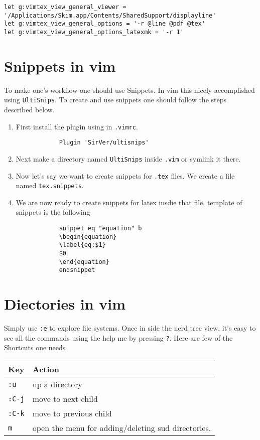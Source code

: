 \documentclass{article}
\begin{document}
\begin{verbatim}
let g:vimtex_view_general_viewer = '/Applications/Skim.app/Contents/SharedSupport/displayline'
let g:vimtex_view_general_options = '-r @line @pdf @tex'
let g:vimtex_view_general_options_latexmk = '-r 1'   
\end{verbatim}


\section{Snippets in vim}
\label{sec:snippets-in-vim}
To make one's workflow one should use Snippets. In vim this nicely accomplished
using \verb!UltiSnips!. To create and use snippets one should follow the steps
described below.

\begin{enumerate}
    \item First install the plugin using in \verb!.vimrc!. 
        \begin{verbatim}
            Plugin 'SirVer/ultisnips'
        \end{verbatim}
    \item Next make a directory named \verb!UltiSnips! inside \verb!.vim! or
        symlink it there. 
    \item Now let's say we want to create snippets for \verb!.tex! files. We
        create a file named \verb!tex.snippets!. 
    \item We are now ready to create snippets for latex insdie that file.
        template of snippets is the following
        \begin{verbatim}
            snippet eq "equation" b
            \begin{equation}
	        \label{eq:$1}
	        $0
            \end{equation}
            endsnippet
        \end{verbatim}
\end{enumerate}

\section{Diectories in vim}%
\label{sec:diectories_in_vim}
Simply use \verb!:e! to explore file systems. Once in side the nerd tree view,
it's easy to see all the commands using the help me by pressing \verb!?!. Here
are few of the Shortcuts one needs

\begin{tabular}{ll}
    \toprule
    Key & Action \\ \midrule
    \verb!:u! & up a directory\\ \midrule
    \verb!:C-j! & move to next child \\ \midrule
    \verb!:C-k! & move to previous child\\ \midrule
    \verb!m! & open the menu for adding/deleting sud directories.\\ \bottomrule
\end{tabular}
\end{document}
